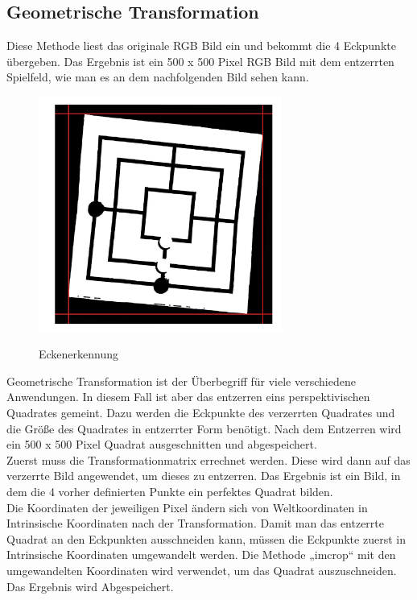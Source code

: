 \documentclass[paper=A4, deutsch]{scrartcl}
\begin{document}
\subsection{Geometrische Transformation}
Diese Methode liest das originale RGB Bild ein und bekommt die 4 Eckpunkte übergeben. Das Ergebnis ist ein 500 x 500 Pixel RGB Bild mit dem entzerrten Spielfeld, wie man es an dem nachfolgenden Bild sehen kann.\\

\begin{figure}[ht]
	\centering
		\includegraphics[width=8cm]{Ecken.png}\\
	\caption[Eckenerkennung]{Eckenerkennung}
	\label{fig:nettop}
\end{figure}

Geometrische Transformation ist der Überbegriff für viele verschiedene Anwendungen. In diesem Fall ist aber das entzerren eins perspektivischen Quadrates gemeint. Dazu werden die Eckpunkte des verzerrten Quadrates und die Größe des Quadrates in entzerrter Form benötigt. Nach dem Entzerren wird ein 500 x 500 Pixel Quadrat ausgeschnitten und abgespeichert.\\
Zuerst muss die Transformationmatrix errechnet werden. Diese wird dann auf das verzerrte Bild angewendet, um dieses zu entzerren. Das Ergebnis ist ein Bild, in dem die 4 vorher definierten Punkte ein perfektes Quadrat bilden.\\
Die Koordinaten der jeweiligen Pixel ändern sich von Weltkoordinaten in Intrinsische Koordinaten nach der Transformation. Damit man das entzerrte Quadrat an den Eckpunkten ausschneiden kann, müssen die Eckpunkte zuerst in Intrinsische Koordinaten umgewandelt werden. Die Methode „imcrop“ mit den umgewandelten Koordinaten wird verwendet, um das Quadrat auszuschneiden. Das Ergebnis wird Abgespeichert.\\
\end{document}
